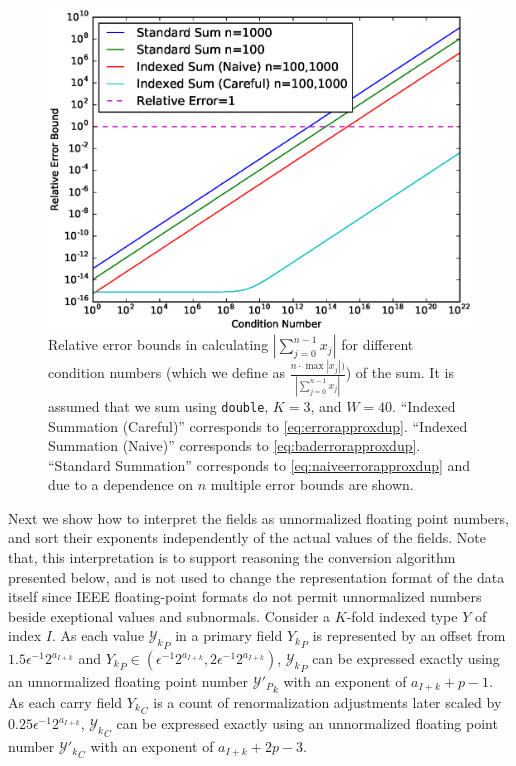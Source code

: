 \begin{figure}[H]
\begin{center}
\includegraphics[width=\textwidth]{plots/error_comparison}
\caption{Relative error bounds in calculating $|\sum \limits_{j = 0}^{n - 1}
x_j|$ for different condition numbers (which we define as $\frac{n \cdot \max
|x_j|)}{|\sum \limits_{j = 0}^{n - 1} x_j|}$) of the sum. It is assumed that we
sum using \texttt{double}, $K = 3$, and $W = 40$. ``Indexed Summation
(Careful)'' corresponds to \eqref{eq:errorapproxdup}. ``Indexed Summation
(Naive)'' corresponds to \eqref{eq:baderrorapproxdup}. ``Standard Summation''
corresponds to \eqref{eq:naiveerrorapproxdup} and due to a dependence on $n$
multiple error bounds are shown.}
\label{fig:conversionmotivation}
\end{center}
\end{figure}

    Next we show how to interpret the fields as unnormalized floating point numbers,
    and sort their exponents independently of the actual values of the fields.
    Note that, this interpretation is to support reasoning the conversion algorithm
    presented below, and is not used to change the representation format of the data itself
    since IEEE floating-point formats do not permit unnormalized numbers
    beside exeptional values and subnormals.
    Consider a $K$-fold indexed type $Y$ of index $I$.
    As each value ${\mathcal{Y}_k}_P$ in a primary field ${Y_k}_P$ is represented by an offset from $1.5  \epsilon^{-1}  2^{a_{I + k}}$ and ${Y_k}_P \in (\epsilon^{-1}  2^{a_{I + k}}, 2  \epsilon^{-1}  2^{a_{I + k}})$, ${\mathcal{Y}_k}_P$ can be expressed exactly using an unnormalized floating point number ${\mathcal{Y}'_P}_k$ with an exponent of $a_{I + k} + p - 1$.
    As each carry field ${Y_k}_C$ is a count of renormalization adjustments later scaled by $0.25  \epsilon^{-1}  2^{a_{I + k}}$, ${\mathcal{Y}_k}_C$ can be expressed exactly using an unnormalized floating point number ${\mathcal{Y}'_k}_C$ with an exponent of $a_{I + k} + 2  p - 3$.

